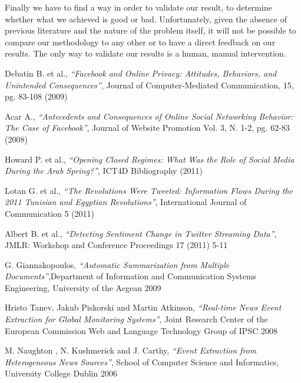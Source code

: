 \documentclass[a4paper]{article}
\begin{document}
Finally we have to find a way in order to validate our result, to determine
whether what we achieved is good or bad. Unfortunately, given the absence of
previous literature and the nature of the problem itself, it will not be
possible to compare our methodology to any other or to have a direct feedback on
our results. The only way to validate our results is a human, manual
intervention.


\begin{thebibliography}{9}
Debatin B. et al., \emph{``Facebook and Online Privacy: Attitudes, Behaviors,
and Unintended Consequences''}, Journal of Computer-Mediated Communication,
15, pg. 83-108 (2009)

Acar A., \emph{``Antecedents and Consequences of Online Social Networking
Behavior: The Case of Facebook''}, Journal of Website Promotion Vol. 3, N.
1-2, pg. 62-83 (2008)

Howard P. et al., \emph{``Opening Closed Regimes: What Was the Role of Social Media
During the Arab Spring?''}, ICT4D Bibliography (2011)

Lotan G. et al., \emph{``The Revolutions Were Tweeted: Information Flows During
the 2011 Tunisian and Egyptian Revolutions''}, International Journal of
Communication 5 (2011)

Albert B. et al., \emph{``Detecting Sentiment Change in Twitter Streaming
	Data''}, JMLR: Workshop and Conference Proceedings 17 (2011) 5-11
	
G. Giannakopoulos, \emph{``Automatic Summarization from Multiple
Documents''},Department of Information and Communication Systems Engineering, University of the Aegean 2009

Hristo Tanev, Jakub Piskorski and Martin Atkinson, \emph{``Real-time News Event Extraction for Global Monitoring Systems''}, Joint Research Center of the European Commission Web and Language Technology Group of IPSC 2008

M. Naughton , N. Kushmerick and J. Carthy, \emph{``Event Extraction from Heterogeneous News Sources''}, School of Computer Science and Informatics, University College Dublin 2006

\end{thebibliography}
\end{document}
